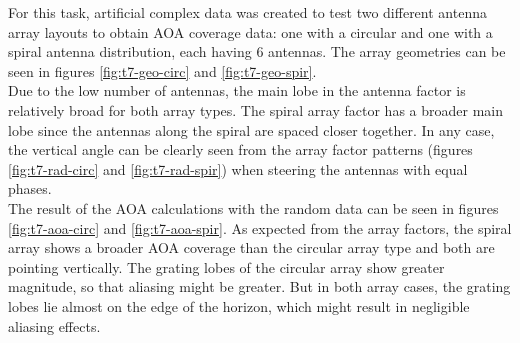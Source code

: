 

For this task, artificial complex data was created to test two different antenna array layouts to obtain AOA coverage data: one with a circular and one with a spiral antenna distribution, each having 6 antennas. The array geometries can be seen in figures \ref{fig:t7-geo-circ} and \ref{fig:t7-geo-spir}.\\

Due to the low number of antennas, the main lobe in the antenna factor is relatively broad for both array types. The spiral array factor has a broader main lobe since the antennas along the spiral are spaced closer together. In any case, the vertical angle can be clearly seen from the array factor patterns (figures \ref{fig:t7-rad-circ} and \ref{fig:t7-rad-spir}) when steering the antennas with equal phases.\\

The result of the AOA calculations with the random data can be seen in figures \ref{fig:t7-aoa-circ} and \ref{fig:t7-aoa-spir}. As expected from the array factors, the spiral array shows a broader AOA coverage than the circular array type and both are pointing vertically. The grating lobes of the circular array show greater magnitude, so that aliasing might be greater. But in both array cases, the grating lobes lie almost on the edge of the horizon, which might result in negligible aliasing effects.

